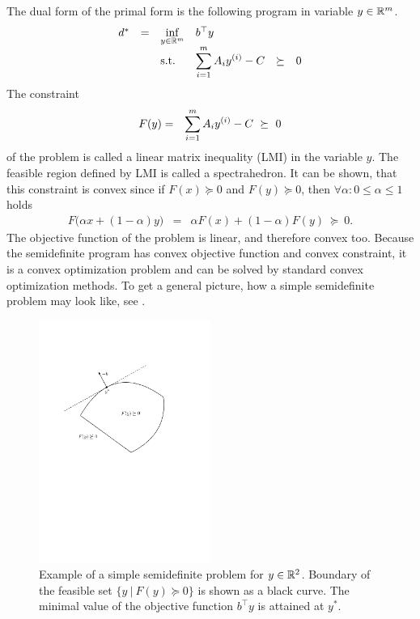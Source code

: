 The dual form of the primal form is the following program in variable $y\in\mathbb{R}^m$.
\begin{eqnarray}
  \begin{array}{rclrrclcll}
    d^* &=& \displaystyle \inf_{y\in\R^m} & \multicolumn{3}{l}{b^\top y} \\
    && \text{s.t.} & \displaystyle \sum_{i=1}^m A_iy\ind i - C &\succeq& 0
  \end{array}\labeleq{SDP:prelim:dual}
\end{eqnarray}
The constraint 
\begin{eqnarray}
  F(y) &=& \sum_{i=1}^m A_iy^{(i)} - C\ \succeq\ 0
\end{eqnarray}
of the problem  is called a linear matrix inequality (LMI) in the variable $y$.
The feasible region defined by LMI is called a spectrahedron.
It can be shown, that this constraint is convex since if $F(x) \succeq 0$ and $F(y) \succeq 0$, then $\forall \alpha: 0\leq  \alpha \leq 1$ holds
\begin{eqnarray}
  F\big(\alpha x + (1-\alpha)y\big) &=& \alpha F(x) + (1-\alpha)F(y)\ \succeq \ 0.
\end{eqnarray}
The objective function of the problem  is linear, and therefore convex too.
Because the semidefinite program  has convex objective function and convex constraint, it is a convex optimization problem and can be solved by standard convex optimization methods.
To get a general picture, how a simple semidefinite problem may look like, see .

\begin{figure}[ht]
  \centering
  \includegraphics[width=0.5\textwidth]{drawings/SDP_problem.pdf}
  \caption{Example of a simple semidefinite problem for $y\in\mathbb{R}^2$. Boundary of the feasible set $\big\{y\ |\ F(y)\succeq 0\big\}$ is shown as a black curve. The minimal value of the objective function $b^\top y$ is attained at $y^*$.}
\end{figure}

